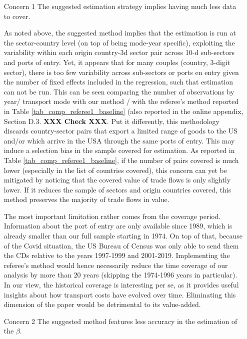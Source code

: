 \documentclass[a4paper,11pt]{article}
\begin{document}
\begin{itemize}
\item[Concern 1] The suggested estimation strategy implies having much less data to cover.

As noted above, the suggested method implies that the estimation is run at the sector-country level (on top of being mode-year specific), exploiting the variability within each origin country-3d sector pair across 10-d sub-sectors and ports of entry. Yet, it appears that for many couples (country, 3-digit sector), there is too few variability across sub-sectors or ports en entry given the number of fixed effects included in the regression, such that estimation can not be run. This can be seen comparing the number of observations by year/ transport mode with our method / with the referee's method reported in Table \ref{tab_comp_referee1_baseline} (also reported in the online appendix, Section D.3. \textbf{XXX Check XXX}. Put it differently, this methodology discards country-sector pairs that export a limited range of goods to the US and/or which arrive in the USA through the same ports of entry. This may induce a selection bias in the sample covered for estimation. As reported in Table  \ref{tab_comp_referee1_baseline}, if the number of pairs covered is much lower (especially in the list of countries covered), this concern can yet be mitigated by noticing that the covered value of trade flows is only slightly lower. If it reduces the sample of sectors and origin countries covered, this method preserves the majority of trade flows in value.

The most important limitation rather comes from the coverage period. Information about the port of entry are only available since 1989, which is already smaller than our full sample starting in 1974. On top of that, because of the Covid situation, the US Bureau of Census was only able to send them the CDs relative to the years 1997-1999 and 2001-2019. Implementing the referee's method would hence necessarily reduce the time coverage of our analysis by more than 20 years (skipping the 1974-1996 years in particular). In our view, the historical coverage is interesting per se, as it provides useful insights about how transport costs have evolved over time. Eliminating this dimension of the paper would be detrimental to its value-added.


\item[Concern 2] The suggested method features less accuracy in the estimation of the $\beta$.


\end{itemize}
\end{document}
